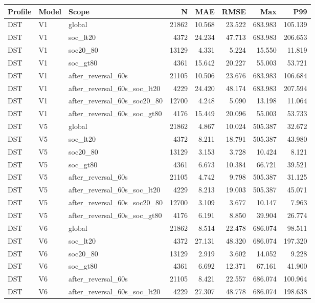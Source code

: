 \begin{tabular}{lllrrrrr}
\hline
Profile & Model & Scope & N & MAE & RMSE & Max & P99 \\
\hline
DST & V1 & global & 21862 & 10.568 & 23.522 & 683.983 & 105.139 \\
DST & V1 & soc\_lt20 & 4372 & 24.234 & 47.713 & 683.983 & 206.653 \\
DST & V1 & soc20\_80 & 13129 & 4.331 & 5.224 & 15.550 & 11.819 \\
DST & V1 & soc\_gt80 & 4361 & 15.642 & 20.227 & 55.003 & 53.721 \\
DST & V1 & after\_reversal\_60s & 21105 & 10.506 & 23.676 & 683.983 & 106.684 \\
DST & V1 & after\_reversal\_60s\_soc\_lt20 & 4229 & 24.420 & 48.174 & 683.983 & 207.594 \\
DST & V1 & after\_reversal\_60s\_soc20\_80 & 12700 & 4.248 & 5.090 & 13.198 & 11.064 \\
DST & V1 & after\_reversal\_60s\_soc\_gt80 & 4176 & 15.449 & 20.096 & 55.003 & 53.733 \\
DST & V5 & global & 21862 & 4.867 & 10.024 & 505.387 & 32.672 \\
DST & V5 & soc\_lt20 & 4372 & 8.211 & 18.791 & 505.387 & 43.980 \\
DST & V5 & soc20\_80 & 13129 & 3.153 & 3.728 & 10.424 & 8.121 \\
DST & V5 & soc\_gt80 & 4361 & 6.673 & 10.384 & 66.721 & 39.521 \\
DST & V5 & after\_reversal\_60s & 21105 & 4.742 & 9.798 & 505.387 & 31.125 \\
DST & V5 & after\_reversal\_60s\_soc\_lt20 & 4229 & 8.213 & 19.003 & 505.387 & 45.071 \\
DST & V5 & after\_reversal\_60s\_soc20\_80 & 12700 & 3.109 & 3.677 & 10.147 & 7.963 \\
DST & V5 & after\_reversal\_60s\_soc\_gt80 & 4176 & 6.191 & 8.850 & 39.904 & 26.774 \\
DST & V6 & global & 21862 & 8.514 & 22.478 & 686.074 & 98.511 \\
DST & V6 & soc\_lt20 & 4372 & 27.131 & 48.320 & 686.074 & 197.320 \\
DST & V6 & soc20\_80 & 13129 & 2.919 & 3.602 & 14.052 & 9.228 \\
DST & V6 & soc\_gt80 & 4361 & 6.692 & 12.371 & 67.161 & 41.900 \\
DST & V6 & after\_reversal\_60s & 21105 & 8.421 & 22.557 & 686.074 & 100.964 \\
DST & V6 & after\_reversal\_60s\_soc\_lt20 & 4229 & 27.307 & 48.778 & 686.074 & 198.638 \\

\end{tabular}

